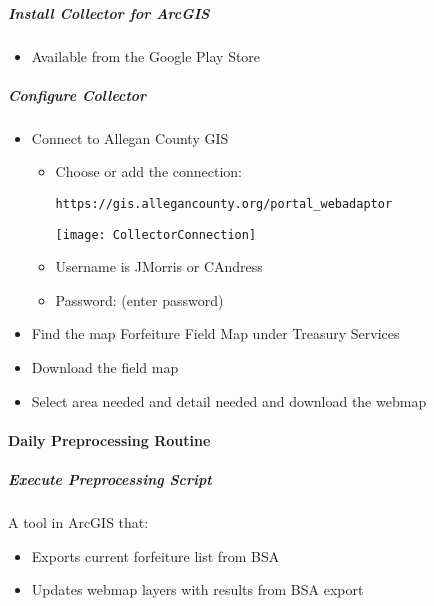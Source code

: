 \documentclass[class=article , crop=false, titlepage, twoside, multi={itemize, figure, verbatim}, float=false]{standalone}
\begin{document}
\subparagraph{Install Collector for ArcGIS}
\begin{itemize}
\item Available from the Google Play Store
\end{itemize}
\subparagraph{Configure Collector}
\begin{itemize}
\item Connect to Allegan County GIS

\begin{itemize}
\item Choose or add the connection:

\begin{verbatim}
https://gis.allegancounty.org/portal_webadaptor
\end{verbatim}

\begin{center}

\texttt{[image: CollectorConnection]}
\end{center}

\item Username is JMorris or CAndress
\item Password: (enter password)

\end{itemize}

\item Find the map Forfeiture Field Map under Treasury Services
\item Download the field map
\item Select area needed and detail needed and download the webmap

\end{itemize}



\paragraph{Daily Preprocessing Routine}

\subparagraph{Execute Preprocessing Script}A tool in ArcGIS that:

\begin{itemize}

\item Exports current forfeiture list from BSA
\item Updates webmap layers with results from BSA export


\end{itemize}
\end{document}
